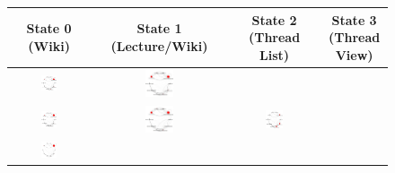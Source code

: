 \begin{figure}
  \centering
  \begin{tabular}{cccc}
    \textbf{State 0 (Wiki)}
    & \textbf{State 1 (Lecture/Wiki)}
    & \textbf{State 2 (Thread List)}
    & \textbf{State 3 (Thread View)}\\\hline
    \includegraphics[width=0.22\textwidth]{figures/sustain-2state/state0.png}
    &
    \includegraphics[width=0.22\textwidth]{figures/sustain-2state/state1.png}\\
    \includegraphics[width=0.22\textwidth]{figures/sustain-3state/state0.png}
    &
    \includegraphics[width=0.22\textwidth]{figures/sustain-3state/state2.png}
    &
    \includegraphics[width=0.22\textwidth]{figures/sustain-3state/state1.png}\\
    \includegraphics[width=0.22\textwidth]{figures/sustain-4state/state0.png}

\end{tabular}
\end{figure}

